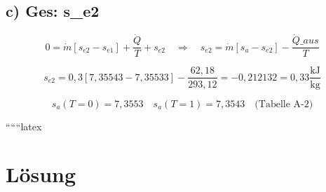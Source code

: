 \subsection*{c) Ges: s\_e2}

\[
0 = \dot{m} \left[ s_{e2} - s_{e1} \right] + \frac{\dot{Q}}{T} + s_{e2} \quad \Rightarrow \quad s_{e2} = \dot{m} \left[ s_{a} - s_{e2} \right] - \frac{\dot{Q}\_aus}{T}
\]

\[
s_{e2} = 0,3 \left[ 7,35543 - 7,35533 \right] - \frac{62,18}{293,12} = -0,212132 = 0,33 \frac{\text{kJ}}{\text{kg}}
\]

\[
s_{a}(T=0) = 7,3553 \quad s_{a}(T=1) = 7,3543 \quad \text{(Tabelle A-2)}
\]

``````latex


\section*{Lösung}